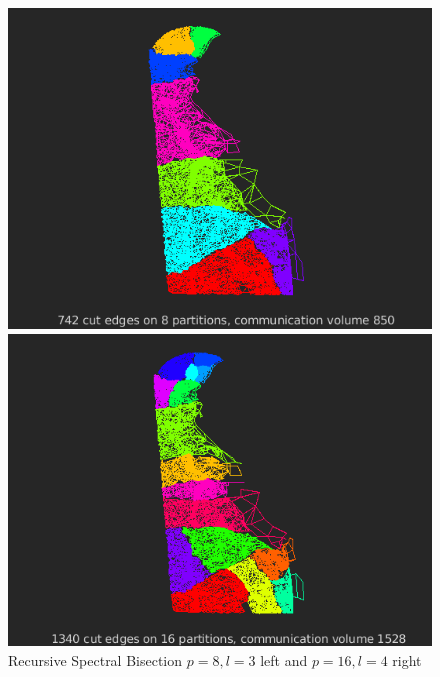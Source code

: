 \documentclass[unicode,11pt,a4paper,oneside,numbers=endperiod,openany]{scrartcl}
\begin{document}
 \begin{figure}[h!]
    \begin{minipage}[c]{0.46\linewidth}
        \centering
        \includegraphics[width=0.8\linewidth]{./img/figure1.png}
    \end{minipage}
    \hfill%
    \begin{minipage}[c]{0.46\linewidth}
        \centering
        \includegraphics[width=0.8\linewidth]{./img/figure2.png}
    \end{minipage}
  \caption{Recursive Spectral Bisection ${p = 8, l = 3}$ left and ${ p = 16, l = 4}$ right}
  \label{fig:Another tiny Web}
\end{figure}
\end{document}

